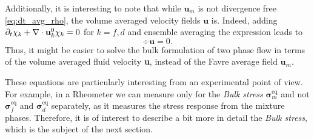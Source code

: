 Additionally, it is interesting to note that while $\textbf{u}_m$ is not divergence free \eqref{eq:dt_avg_rho}, the volume averaged velocity fields $\textbf{u}$ is. 
Indeed, adding $\partial_t \chi_k + \mathbf{\nabla}\cdot \textbf{u}_k^0\chi_k =0$ for $k=f,d$ and ensemble averaging the expression leads to 
\begin{equation}
    \div\textbf{u}=0.
\end{equation}
Thus, it might be easier to solve the bulk formulation of two phase flow in terms of the volume averaged fluid velocity \textbf{u}, instead of the Favre average field $\textbf{u}_m$.

These equations are particularly interesting from an experimental point of view. 
For example, in a Rheometer we can measure only for the \textit{Bulk stress} $\bm\sigma^\text{eq}_m$ and not $\bm\sigma^\text{eq}_f$ and $\bm\sigma^\text{eq}_d$ separately, as it measures the stress response from the mixture phases. 
Therefore, it is of interest to describe a bit more in detail the \textit{Bulk stress}, which is the subject of the next section.